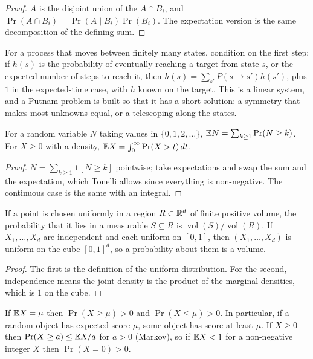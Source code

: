 \begin{proof}
$A$ is the disjoint union of the $A\cap B_i$, and $\Pr(A\cap B_i)=\Pr(A\mid B_i)\Pr(B_i)$. The expectation version is the same decomposition of the defining sum.
\end{proof}

For a process that moves between finitely many states, condition on the first step: if $h(s)$ is the probability of eventually reaching a target from state $s$, or the expected number of steps to reach it, then $h(s)=\sum_{s'}P(s\to s')h(s')$, plus $1$ in the expected-time case, with $h$ known on the target. This is a linear system, and a Putnam problem is built so that it has a short solution: a symmetry that makes most unknowns equal, or a telescoping along the states.

\begin{proposition}
For a random variable $N$ taking values in $\{0,1,2,\dots\}$, $\mathbb{E} N=\sum_{k\ge 1}\Pr(N\ge k)$. For $X\ge 0$ with a density, $\mathbb{E} X=\int_0^\infty\Pr(X>t)\,dt$.
\end{proposition}

\begin{proof}
$N=\sum_{k\ge1}\mathbf 1[N\ge k]$ pointwise; take expectations and swap the sum and the expectation, which Tonelli allows since everything is non-negative. The continuous case is the same with an integral.
\end{proof}

\begin{proposition}
If a point is chosen uniformly in a region $R\subset\mathbb{R}^d$ of finite positive volume, the probability that it lies in a measurable $S\subseteq R$ is $\operatorname{vol}(S)/\operatorname{vol}(R)$. If $X_1,\dots,X_d$ are independent and each uniform on $[0,1]$, then $(X_1,\dots,X_d)$ is uniform on the cube $[0,1]^d$, so a probability about them is a volume.
\end{proposition}

\begin{proof}
The first is the definition of the uniform distribution. For the second, independence means the joint density is the product of the marginal densities, which is $1$ on the cube.
\end{proof}

\begin{proposition}
If $\mathbb{E} X=\mu$ then $\Pr(X\ge\mu)>0$ and $\Pr(X\le\mu)>0$. In particular, if a random object has expected score $\mu$, some object has score at least $\mu$. If $X\ge 0$ then $\Pr(X\ge a)\le\mathbb{E} X/a$ for $a>0$ (Markov), so if $\mathbb{E} X<1$ for a non-negative integer $X$ then $\Pr(X=0)>0$.
\end{proposition}

